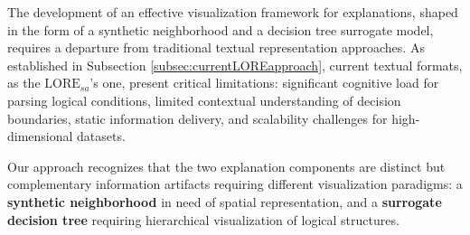 


The development of an effective visualization framework for explanations, shaped in the form of a synthetic neighborhood and a decision tree surrogate model, requires a departure from traditional textual representation approaches. As established in Subsection \ref{subsec:currentLOREapproach}, current textual formats, as the $\text{LORE}_{sa}$'s one, present critical limitations: significant cognitive load for parsing logical conditions, limited contextual understanding of decision boundaries, static information delivery, and scalability challenges for high-dimensional datasets.

Our approach recognizes that 
the two explanation components are 
distinct but complementary information artifacts requiring different visualization paradigms: a \textbf{synthetic neighborhood} in need of spatial representation, and a \textbf{surrogate decision tree} requiring hierarchical visualization of logical structures. 




